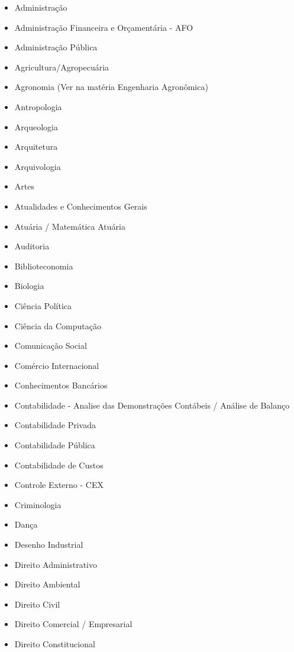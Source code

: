    \begin{multicols}{2}
    \begin{itemize}
        \item Administração
        \item Administração Financeira e Orçamentária - AFO
        \item Administração Pública
        \item Agricultura/Agropecuária
        \item Agronomia (Ver na matéria Engenharia Agronômica)
        \item Antropologia
        \item Arqueologia
        \item Arquitetura
        \item Arquivologia
        \item Artes
        \item Atualidades e Conhecimentos Gerais
        \item Atuária / Matemática Atuária
        \item Auditoria
        \item Biblioteconomia
        \item Biologia
        \item Ciência Política
        \item Ciência da Computação
        \item Comunicação Social
        \item Comércio Internacional
        \item Conhecimentos Bancários
        \item Contabilidade - Analise das Demonstrações Contábeis / Análise de Balanço
        \item Contabilidade Privada
        \item Contabilidade Pública
        \item Contabilidade de Custos
        \item Controle Externo - CEX
        \item Criminologia
        \item Dança
        \item Desenho Industrial
        \item Direito Administrativo
        \item Direito Ambiental
        \item Direito Civil
        \item Direito Comercial / Empresarial
        \item Direito Constitucional

\end{itemize}
\end{multicols}
